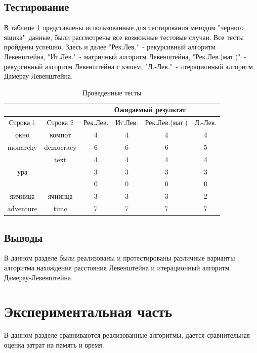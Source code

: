 \documentclass[a4paper,oneside,14pt]{extreport}
\begin{document}
\section{Тестирование}
В таблице \ref{tab:tests} представлены использованные для тестирования методом "черного ящика"\ данные, были рассмотрены все возможные тестовые случаи. Все тесты пройдены успешно. Здесь и далее "Рек.Лев."\ - рекурсивный алгоритм Левенштейна, "Ит.Лев."\ - матричный алгоритм Левенштейна, "Рек.Лев.(мат.)"\ - рекурсивный алгоритм Левенштейна с кэшем, "Д.-Лев."\ - итерационный алгоритм Дамерау-Левенштейна.
\newpage
\begin{table}[h]
	\begin{center}
		\captionsetup{justification=raggedleft, singlelinecheck=false}
		\caption[]{\label{tab:tests} Проведенные тесты}
		\begin{tabular}{|c|c|c|c|c|c|}
			\hline
			&                    & \multicolumn{4}{c|}{\bfseries Ожидаемый результат}    \\ \cline{3-4} \cline{4-5} \cline{5-6}\hline
			Строка 1& Строка 2 & Рек.Лев.&Ит.Лев.&Рек.Лев.(мат.)& Д.-Лев.\\ [0.5ex]
			\hline
			окно & компот & 4 & 4&4& 4\\
			\hline
			monarchy & democracy & 6 & 6& 6 & 5\\
			\hline
			  & text & 4 & 4 & 4 & 4\\
			\hline
			ура &   & 3 & 3& 3& 3\\
			\hline
			 &  & 0 & 0& 0 & 0\\
			\hline
			яичница & ячиинца & 3 & 3 & 3 & 2\\
			\hline
			adventure & time & 7 & 7 & 7 & 7\\
			\hline
		\end{tabular}
	\end{center}
\end{table}

\section{Выводы}
В данном разделе были реализованы и протестированы различные варианты алгоритма нахождения расстояния Левенштейна и итерационный алгоритм Дамерау-Левенштейна.
\newpage

\chapter{Экспериментальная часть}
В данном разделе сравниваются реализованные алгоритмы, дается сравнительная оценка затрат на память и время.
\end{document}

